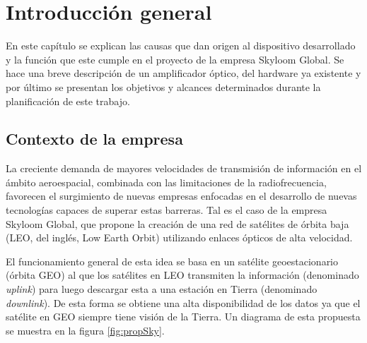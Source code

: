 
\chapter{Introducción general} %

\label{Chapter1} %
\label{IntroGeneral}


\newcommand{\keyword}[1]{\textbf{#1}}
\newcommand{\tabhead}[1]{\textbf{#1}}
\newcommand{\code}[1]{\texttt{#1}}
\newcommand{\file}[1]{\texttt{\bfseries#1}}
\newcommand{\option}[1]{\texttt{\itshape#1}}
\newcommand{\grados}{$^{\circ}$}


En este capítulo se explican las causas que dan origen al dispositivo desarrollado y la función que este cumple en el proyecto de la empresa Skyloom Global. Se hace una breve descripción de un amplificador óptico, del hardware ya existente y por último se presentan los objetivos y alcances determinados durante la planificación de este trabajo.


\section{Contexto de la empresa}
\label{sec:contexto}

La creciente demanda de mayores velocidades de transmisión de información en el ámbito aeroespacial, combinada con las limitaciones de la radiofrecuencia, favorecen el surgimiento de nuevas empresas enfocadas en el desarrollo de nuevas tecnologías capaces de superar estas barreras. Tal es el caso de la empresa Skyloom Global, que propone la creación de una red de satélites de órbita baja (LEO, del inglés, Low Earth Orbit) \citep{WEBSITE:LEO} utilizando enlaces ópticos de alta velocidad.

El funcionamiento general de esta idea se basa en un satélite geoestacionario (órbita GEO) \citep{WEBSITE:GEO} al que los satélites en LEO transmiten la información (denominado \textit{uplink}) para luego descargar esta a una estación en Tierra (denominado \textit{downlink}). De esta forma se obtiene una alta disponibilidad de los datos ya que el satélite en GEO siempre tiene visión de la Tierra. Un diagrama de esta propuesta se muestra en la figura \ref{fig:propSky}.

